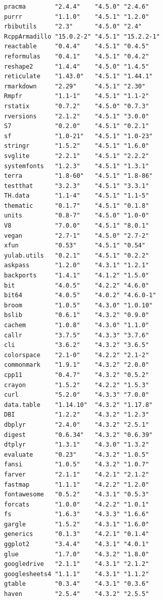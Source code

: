 \documentclass[
  letterpaper,
  DIV=11,
  numbers=noendperiod]{scrreprt}
\begin{document}
\begin{verbatim}
pracma        "2.4.4"    "4.5.0" "2.4.6"   
purrr         "1.1.0"    "4.5.1" "1.2.0"   
rbibutils     "2.3"      "4.5.0" "2.4"     
RcppArmadillo "15.0.2-2" "4.5.1" "15.2.2-1"
reactable     "0.4.4"    "4.5.1" "0.4.5"   
reformulas    "0.4.1"    "4.5.1" "0.4.2"   
reshape2      "1.4.4"    "4.5.0" "1.4.5"   
reticulate    "1.43.0"   "4.5.1" "1.44.1"  
rmarkdown     "2.29"     "4.5.1" "2.30"    
Rmpfr         "1.1-1"    "4.5.1" "1.1-2"   
rstatix       "0.7.2"    "4.5.0" "0.7.3"   
rversions     "2.1.2"    "4.5.1" "3.0.0"   
S7            "0.2.0"    "4.5.1" "0.2.1"   
sf            "1.0-21"   "4.5.1" "1.0-23"  
stringr       "1.5.2"    "4.5.1" "1.6.0"   
svglite       "2.2.1"    "4.5.1" "2.2.2"   
systemfonts   "1.2.3"    "4.5.1" "1.3.1"   
terra         "1.8-60"   "4.5.1" "1.8-86"  
testthat      "3.2.3"    "4.5.1" "3.3.1"   
TH.data       "1.1-4"    "4.5.1" "1.1-5"   
thematic      "0.1.7"    "4.5.1" "0.1.8"   
units         "0.8-7"    "4.5.0" "1.0-0"   
V8            "7.0.0"    "4.5.1" "8.0.1"   
vegan         "2.7-1"    "4.5.0" "2.7-2"   
xfun          "0.53"     "4.5.1" "0.54"    
yulab.utils   "0.2.1"    "4.5.1" "0.2.2"   
askpass       "1.2.0"    "4.3.1" "1.2.1"   
backports     "1.4.1"    "4.1.2" "1.5.0"   
bit           "4.0.5"    "4.2.2" "4.6.0"   
bit64         "4.0.5"    "4.0.2" "4.6.0-1" 
broom         "1.0.5"    "4.3.0" "1.0.10"  
bslib         "0.6.1"    "4.3.2" "0.9.0"   
cachem        "1.0.8"    "4.3.0" "1.1.0"   
callr         "3.7.5"    "4.3.3" "3.7.6"   
cli           "3.6.2"    "4.3.2" "3.6.5"   
colorspace    "2.1-0"    "4.2.2" "2.1-2"   
commonmark    "1.9.1"    "4.3.2" "2.0.0"   
cpp11         "0.4.7"    "4.3.2" "0.5.2"   
crayon        "1.5.2"    "4.2.2" "1.5.3"   
curl          "5.2.0"    "4.3.3" "7.0.0"   
data.table    "1.14.10"  "4.3.2" "1.17.8"  
DBI           "1.2.2"    "4.3.2" "1.2.3"   
dbplyr        "2.4.0"    "4.3.2" "2.5.1"   
digest        "0.6.34"   "4.3.2" "0.6.39"  
dtplyr        "1.3.1"    "4.3.0" "1.3.2"   
evaluate      "0.23"     "4.3.2" "1.0.5"   
fansi         "1.0.5"    "4.3.2" "1.0.7"   
farver        "2.1.1"    "4.2.1" "2.1.2"   
fastmap       "1.1.1"    "4.2.2" "1.2.0"   
fontawesome   "0.5.2"    "4.3.1" "0.5.3"   
forcats       "1.0.0"    "4.2.2" "1.0.1"   
fs            "1.6.3"    "4.3.3" "1.6.6"   
gargle        "1.5.2"    "4.3.1" "1.6.0"   
generics      "0.1.3"    "4.2.1" "0.1.4"   
ggplot2       "3.4.4"    "4.3.1" "4.0.1"   
glue          "1.7.0"    "4.3.2" "1.8.0"   
googledrive   "2.1.1"    "4.3.1" "2.1.2"   
googlesheets4 "1.1.1"    "4.3.1" "1.1.2"   
gtable        "0.3.4"    "4.3.1" "0.3.6"   
haven         "2.5.4"    "4.3.2" "2.5.5"   

\end{verbatim}
\end{document}
